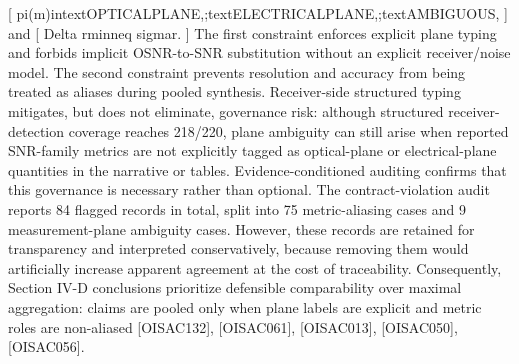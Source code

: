 {}[\markdownRendererSoftLineBreak
{}\markdownRendererBackslash{}pi(m)\markdownRendererBackslash{}in\markdownRendererLeftBrace{}\markdownRendererBackslash{}text\markdownRendererLeftBrace{}OPTICAL\markdownRendererUnderscore{}PLANE\markdownRendererRightBrace{},;\markdownRendererBackslash{}text\markdownRendererLeftBrace{}ELECTRICAL\markdownRendererUnderscore{}PLANE\markdownRendererRightBrace{},;\markdownRendererBackslash{}text\markdownRendererLeftBrace{}AMBIGUOUS\markdownRendererRightBrace{}\markdownRendererRightBrace{},\markdownRendererSoftLineBreak
{}]\markdownRendererSoftLineBreak
{}and\markdownRendererSoftLineBreak
{}[\markdownRendererSoftLineBreak
{}\markdownRendererBackslash{}Delta r\markdownRendererUnderscore{}\markdownRendererLeftBrace{}\markdownRendererBackslash{}min\markdownRendererRightBrace{}\markdownRendererBackslash{}neq \markdownRendererBackslash{}sigma\markdownRendererUnderscore{}r.\markdownRendererSoftLineBreak
{}]\markdownRendererSoftLineBreak
{}The first constraint enforces explicit plane typing and forbids implicit OSNR-to-SNR substitution without an explicit receiver/noise model. The second constraint prevents resolution and accuracy from being treated as aliases during pooled synthesis.\markdownRendererParagraphSeparator
{}Receiver-side structured typing mitigates, but does not eliminate, governance risk: although structured receiver-detection coverage reaches 218/220, plane ambiguity can still arise when reported SNR-family metrics are not explicitly tagged as optical-plane or electrical-plane quantities in the narrative or tables.\markdownRendererParagraphSeparator
{}Evidence-conditioned auditing confirms that this governance is necessary rather than optional. The contract-violation audit reports 84 flagged records in total, split into 75 metric-aliasing cases and 9 measurement-plane ambiguity cases. However, these records are retained for transparency and interpreted conservatively, because removing them would artificially increase apparent agreement at the cost of traceability. Consequently, Section IV-D conclusions prioritize defensible comparability over maximal aggregation: claims are pooled only when plane labels are explicit and metric roles are non-aliased [O\markdownRendererUnderscore{}ISAC\markdownRendererUnderscore{}132], [O\markdownRendererUnderscore{}ISAC\markdownRendererUnderscore{}061], [O\markdownRendererUnderscore{}ISAC\markdownRendererUnderscore{}013], [O\markdownRendererUnderscore{}ISAC\markdownRendererUnderscore{}050], [O\markdownRendererUnderscore{}ISAC\markdownRendererUnderscore{}056].\markdownRendererParagraphSeparator
